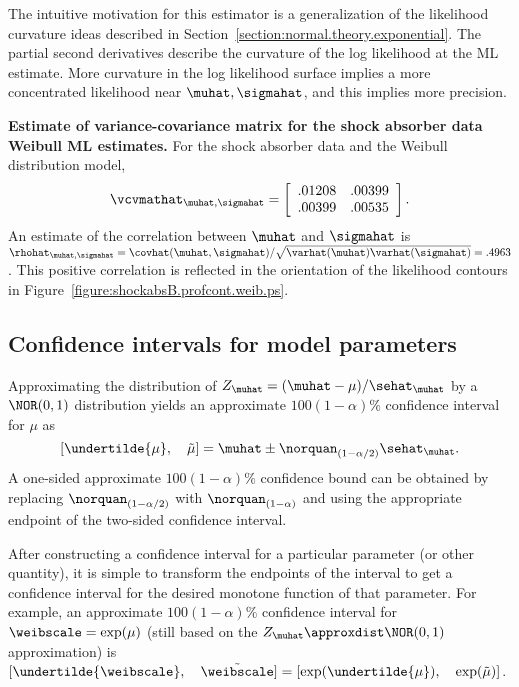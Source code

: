 The intuitive motivation for this estimator is a generalization of the 
likelihood curvature ideas described in
Section~\ref{section:normal.theory.exponential}. 
The partial second derivatives describe the curvature 
of the log likelihood at the ML estimate.
More curvature in the log likelihood surface implies a more concentrated
likelihood near
$\muhat,\sigmahat$, and this implies more precision.

\begin{example}
\label{example:shockabs.vcv.estimate}
{\bf Estimate of variance-covariance matrix for the shock absorber
data Weibull ML estimates.}
For the shock absorber data and the Weibull distribution model,
\begin{equation}
\label{shock.absorber.weibull.vcv}
\vcvmathat_{\muhat,\sigmahat}=
\left[ 
\begin{array}{rr}
.01208 &.00399\\
.00399 & .00535
\end{array}
\right].
\end{equation}
An estimate of the correlation between $\muhat$ and $\sigmahat$
is $\rhohat_{\muhat,\sigmahat}=
\covhat(\muhat,\sigmahat)/\sqrt{\varhat(\muhat)\varhat(\sigmahat)}=.4963$.
This positive correlation is reflected in the orientation
of the likelihood contours in 
 Figure~\ref{figure:shockabsB.profcont.weib.ps}.
\end{example}

\subsection{Confidence intervals for model parameters}
\label{section:ci.ls.param}
Approximating the distribution of
$Z_{\muhat}=(\muhat-\mu)/\sehat_{\muhat}$ by a $\NOR(0,1)$ distribution
yields an approximate $100(1-\alpha)\%$ confidence interval for $\mu$ as
\begin{equation}
\label{equation:normal.theory.ci.for.mu}
 [\undertilde{\mu}, \quad \tilde{\mu}] = 
\muhat \pm  \norquan_{(1-\alpha/2)}\sehat_{\muhat}.
\end{equation}
A one-sided approximate $100(1-\alpha)\%$
confidence bound can be obtained by replacing
$\norquan_{(1-\alpha/2)}$ with $\norquan_{(1-\alpha)}$ and using the
appropriate endpoint of the two-sided confidence interval.

After constructing a confidence interval for a particular parameter
(or other quantity), it is simple to transform the endpoints of the
interval to get a confidence interval for the desired monotone
function of that parameter.  For example, an approximate
$100(1-\alpha)\%$ confidence interval for $\weibscale=\exp(\mu)$
(still based on the $Z_{\muhat} \approxdist
\NOR(0,1)$
approximation) is
$ [\undertilde{\weibscale},\quad \tilde{\weibscale}] = 
	[\exp(\undertilde{\mu}),\quad \exp(\tilde{\mu})]$.

